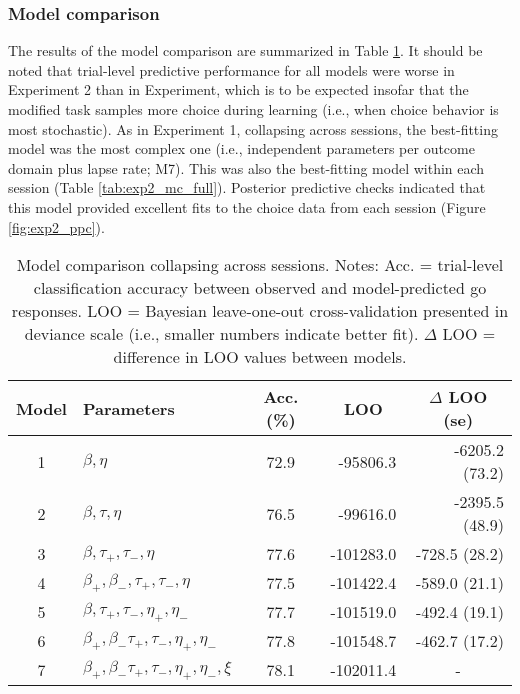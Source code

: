 \documentclass[a4paper,12pt]{article}
\begin{document}
\begin{refsection}[main]
\subsubsection*{Model comparison}

The results of the model comparison are summarized in Table \ref{tab:exp2_mc_abbr}. It should be noted that trial-level predictive performance for all models were worse in Experiment 2 than in Experiment, which is to be expected insofar that the modified task samples more choice during learning (i.e., when choice behavior is most stochastic). As in Experiment 1, collapsing across sessions, the best-fitting model was the most complex one (i.e., independent parameters per outcome domain plus lapse rate; M7). This was also the best-fitting model within each session (Table \ref{tab:exp2_mc_full}). Posterior predictive checks indicated that this model provided excellent fits to the choice data from each session (Figure \ref{fig:exp2_ppc}). 

\begin{table}[b!]
    \centering
    \begin{tabular}{clcrr}
        \toprule
        Model & Parameters & Acc. (\%) & \multicolumn{1}{c}{LOO} & \multicolumn{1}{c}{$\Delta$ LOO (se)} \\
        \midrule
        1 & $\beta, \eta$ & 72.9 & -95806.3 & -6205.2 (73.2) \\
        2 & $\beta, \tau, \eta$ & 76.5 & -99616.0 & -2395.5 (48.9) \\
        3 & $\beta, \tau_+, \tau_-, \eta$ & 77.6 & -101283.0 & -728.5 (28.2) \\
        4 & $\beta_+, \beta_-, \tau_+, \tau_-, \eta$ & 77.5 & -101422.4 & -589.0 (21.1) \\
        5 & $\beta, \tau_+, \tau_-, \eta_+, \eta_-$ & 77.7 & -101519.0 & -492.4 (19.1) \\
        6 & $\beta_+, \beta_- \tau_+, \tau_-, \eta_+, \eta_-$ & 77.8 & -101548.7 & -462.7 (17.2) \\
        7 & $\beta_+, \beta_- \tau_+, \tau_-, \eta_+, \eta_-, \xi$ & 78.1 & -102011.4 & \multicolumn{1}{c}{-} \\
        \bottomrule
\end{tabular}
    \caption{Model comparison collapsing across sessions. Notes: Acc. = trial-level classification accuracy between observed and model-predicted go responses. LOO = Bayesian leave-one-out cross-validation presented in deviance scale (i.e., smaller numbers indicate better fit). $\Delta$ LOO = difference in LOO values between models.}
    \label{tab:exp2_mc_abbr}
\end{table}


\end{refsection}
\end{document}
